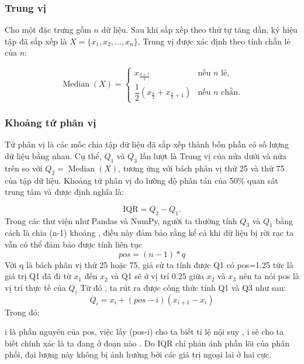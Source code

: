 \documentclass[12pt,a4paper]{article}
\begin{document}
\subsubsection*{Trung vị}

Cho một đặc trưng gồm $n$ dữ liệu. Sau khi sắp xếp theo thứ tự tăng
dần, ký hiệu tập đã sắp xếp là $X = \{x_1, x_2, \dots, x_n\}$,
Trung vị được xác định theo tính chẵn lẻ của $n$:

\begin{equation}
    \operatorname{Median}(X) =
    \begin{cases}
        x_{\frac{n+1}{2}} & \text{nếu } n \text{ lẻ,} \\[6pt]
        \dfrac{1}{2}\!\left(x_{\frac{n}{2}} + x_{\frac{n}{2}+1}\right)
        & \text{nếu } n \text{ chẵn.}
    \end{cases}
\end{equation}

\subsubsection*{Khoảng tứ phân vị}

Tứ phân vị là các mốc chia tập dữ liệu đã sắp xếp thành bốn phần
có số lượng dữ liệu bằng nhau. Cụ thể, $Q_1$ và $Q_3$ lần lượt là
Trung vị của nửa dưới và nửa trên so với $Q_2 = \operatorname{Median}(X)$,
tương ứng với bách phân vị thứ 25 và thứ 75 của tập dữ liệu.
Khoảng tứ phân vị đo lường độ phân tán của 50\% quan sát trung tâm
và được định nghĩa là:

\begin{equation}
    \text{IQR} = Q_3 - Q_1.
\end{equation}
Trong các thư viện như Pandas và NumPy, người ta thường tính $Q_3$ và $Q_1$ bằng cách là chia (n-1) khoảng , điều này đảm bảo rằng kể cả khi dữ liệu bị rời rạc ta vẫn có thể đảm bảo được tính liên tục   
\begin{equation}
    pos=(n-1)*q
\end{equation} 
Với q là bách phân vị thứ 25 hoặc 75, giả sử ta tính được Q1 có pos=1.25 tức là giá trị Q1 đã đi từ $x_1$ đến $x_2$ và Q1 sẽ ở vị trí 0.25 giữa $x_2$ và $x_3$ nên ta nói pos là vị trí thực tế của $Q_i$
\newline
Từ đó , ta rút ra được công thức tính Q1 và Q3 như sau:
\[
Q_i=x_i+(pos-i)(x_{i+1}-x_i)
\] 
Trong đó:

i là phần nguyên của pos, việc lấy (pos-i) cho ta biết tỉ lệ nội suy , i sẽ cho ta biết chính xác là ta đang ở đoạn nào .  
\newline
Do IQR chỉ phản ánh phần lõi của phân phối, đại lượng này không bị
ảnh hưởng bởi các giá trị ngoại lai ở hai cực.
\end{document}

